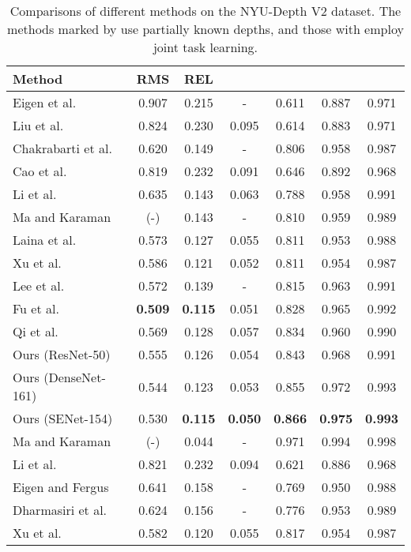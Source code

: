 \documentclass[10pt,twocolumn,letterpaper]{article}
\begin{document}
\setlength{\tabcolsep}{3.2pt}
\begin{table*}[!t]
\begin{center}
\caption{Comparisons of different methods on the NYU-Depth V2 dataset. The methods marked by  use partially known depths, and those with  employ joint task learning.}
\label{nyu_depth}
\begin{tabular}{|l|c|c|c|c|c|c|}
\hline
Method & RMS & REL &&  &  & \\
\hline\hline
Eigen et al. \protect\cite{Eigen2014depth} &0.907  &0.215 &- &0.611 &0.887 &0.971\\   
Liu et al. \protect\cite{liu2015deep} &0.824  &0.230 &0.095 &0.614 &0.883 &0.971   \\ 
Chakrabarti et al. \protect\cite{chakrabarti2016depth} &0.620  &0.149 &- &0.806 &0.958 &0.987\\ 
Cao et al. \protect\cite{cao2017estimating} &0.819  &0.232 &0.091 &0.646 &0.892 &0.968\\
Li et al. \protect\cite{li2017two}  &0.635 &0.143 &0.063 &0.788 &0.958 &0.991 \\
Ma and Karaman  \protect\cite{ma2017sparse} 	&(-)  &0.143 &- &0.810 &0.959 &0.989	 \\    
Laina et al. \protect\cite{laina2016deeper} &0.573 &0.127 &0.055 &0.811 &0.953 &0.988 \\ 
Xu et al. \protect\cite{Xu2017MultiscaleCC} &0.586  &0.121 &0.052 &0.811 &0.954 &0.987	\\  
Lee et al. \protect\cite{lee2018single} &0.572  &0.139 &- &0.815 &0.963 &0.991	 \\    
Fu et al. \protect\cite{fu2018deep} 	&\textbf{0.509}  &\textbf{0.115} &0.051 &0.828 &0.965 &0.992	 \\    
Qi et al. \protect\cite{qi2018geonet} &0.569  &0.128 &0.057 &0.834 &0.960 &0.990	 \\  
\hline
Ours (ResNet-50) &0.555 &0.126&0.054 &0.843 &0.968 &0.991\\ 
Ours (DenseNet-161) &0.544 &0.123 &0.053 &0.855 &0.972 &0.993\\ 
Ours (SENet-154) &0.530 &\textbf{0.115}  &\textbf{0.050} &\textbf{0.866} &\textbf{0.975} &\textbf{0.993}\\\hline
Ma and Karaman \protect\cite{ma2017sparse} 	&(-)   &0.044&- &0.971 &0.994 &0.998	 \\  
Li et al. \protect\cite{Li2015DepthAS} &0.821  &0.232 &0.094 &0.621 &0.886 &0.968  \\ 
Eigen and Fergus \protect\cite{Eigen2015PredictingDS} & 0.641  &0.158&- & 0.769 & 0.950 & 0.988	\\ 
Dharmasiri et al. \protect\cite{Dharmasiri2017JointPO}	&0.624  &0.156&- &0.776 &0.953 &0.989	\\  
Xu et al. \protect\cite{xu2018pad}	&0.582  &0.120&0.055 &0.817 &0.954 &0.987	\\  
\hline
\end{tabular}
\end{center}
\end{table*}
\setlength{\tabcolsep}{1.4pt}
\end{document}
